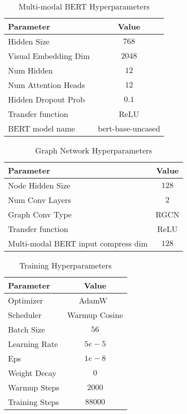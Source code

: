 \documentclass[final]{cvpr}
\providecommand{\MMBERTBase}{Multi-modal BERT\xspace}
\begin{document}
\begin{table}[h]
\begin{center}
\begin{tabular}{@{}lc@{}}
\toprule
Parameter & Value\\ \midrule
Hidden Size & $768$ \\
Visual Embedding Dim & $2048$ \\
Num Hidden & $12$ \\
Num Attention Heads & $12$ \\
Hidden Dropout Prob & $0.1$ \\
Transfer function & ReLU \\
BERT model name & bert-base-uncased \\
\bottomrule
\end{tabular}
\end{center}
\caption{\MMBERTBase Hyperparameters}
\label{table:mmbertparams}
\end{table}

\begin{table}[h]
\begin{center}
\begin{tabular}{@{}lc@{}}
\toprule
Parameter & Value\\ \midrule
Node Hidden Size & $128$ \\
Num Conv Layers & $2$ \\
Graph Conv Type & RGCN \\
Transfer function & ReLU \\
\MMBERTBase input compress dim & $128$ \\
\bottomrule
\end{tabular}
\end{center}
\caption{Graph Network Hyperparameters}
\label{table:graphparams}
\end{table}

\begin{table}[h]
\begin{center}
\begin{tabular}{@{}lc@{}}
\toprule
Parameter & Value\\ \midrule
Optimizer & AdamW~\cite{kingma2014adam} \\
Scheduler & Warmup Cosine \\
Batch Size & $56$ \\
Learning Rate & $5e-5$ \\
Eps & $1e-8$ \\
Weight Decay & $0$ \\
Warmup Steps & $2000$ \\
Training Steps & $88000$ \\
\bottomrule
\end{tabular}
\end{center}
\caption{Training Hyperparameters}
\label{table:trainparams}
\end{table}
\end{document}
